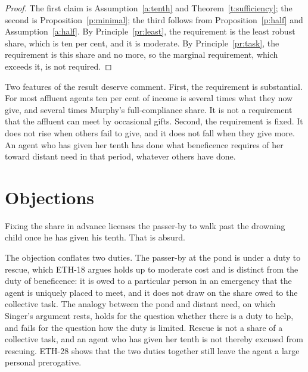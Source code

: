 \documentclass{situationist-preprint}
\begin{document}
\begin{proof}
The first claim is Assumption~\ref{a:tenth} and Theorem~\ref{t:sufficiency}; the second is Proposition~\ref{p:minimal}; the third follows from Proposition~\ref{p:half} and Assumption~\ref{a:half}. By Principle~\ref{pr:least}, the requirement is the least robust share, which is ten per cent, and it is moderate. By Principle~\ref{pr:task}, the requirement is this share and no more, so the marginal requirement, which exceeds it, is not required.
\end{proof}

Two features of the result deserve comment. First, the requirement is substantial. For most affluent agents ten per cent of income is several times what they now give, and several times Murphy's full-compliance share. It is not a requirement that the affluent can meet by occasional gifts. Second, the requirement is fixed. It does not rise when others fail to give, and it does not fall when they give more. An agent who has given her tenth has done what beneficence requires of her toward distant need in that period, whatever others have done.

\section{Objections}\label{s:objections}

\begin{objection}
Fixing the share in advance licenses the passer-by to walk past the drowning child once he has given his tenth. That is absurd.
\end{objection}

\begin{reply}
The objection conflates two duties. The passer-by at the pond is under a duty to rescue, which ETH-18 argues holds up to moderate cost and is distinct from the duty of beneficence: it is owed to a particular person in an emergency that the agent is uniquely placed to meet, and it does not draw on the share owed to the collective task. The analogy between the pond and distant need, on which Singer's argument rests, holds for the question whether there is a duty to help, and fails for the question how the duty is limited. Rescue is not a share of a collective task, and an agent who has given her tenth is not thereby excused from rescuing. ETH-28 shows that the two duties together still leave the agent a large personal prerogative.
\end{reply}
\end{document}
